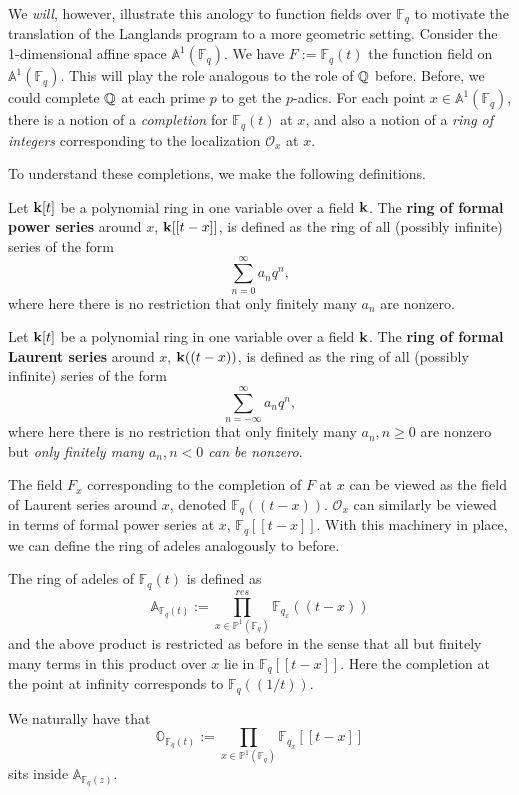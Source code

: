 We \emph{will}, however, illustrate this anology to function fields over $\mathbb F_q$ to motivate the translation of the Langlands program to a more geometric setting. Consider the 1-dimensional affine space $\mathbb A^1 (\mathbb F_q)$. We have $F := \mathbb F_q(t)$ the function field on $\mathbb A^1 (\mathbb F_q)$. This will play the role analogous to the role of $\mathbb{Q}$ before. Before, we could complete $\mathbb{Q}$ at each prime $p$ to get the $p$-adics. For each point $x \in \mathbb A^1 (\mathbb F_q)$, there is a notion of a \emph{completion} for $\mathbb F_q(t)$ at $x$, and also a notion of a \emph{ring of integers} corresponding to the localization $\mathcal O_x$ at $x$.

To understand these completions, we make the following definitions.
\begin{defn}
	Let $\mathbf{k}[t]$ be a polynomial ring in one variable over a field $\mathbf{k}$. The \textbf{ring of formal power series} around $x$, $\mathbf{k}[[t-x]]$, is defined as the ring of all (possibly infinite) series of the form
	\[
		\sum_{n=0}^\infty a_n q^n,
	\]
	where here there is no restriction that only finitely many $a_n$ are nonzero. 
\end{defn}

\begin{defn}
	Let $\mathbf{k}[t]$ be a polynomial ring in one variable over a field $\mathbf{k}$. The \textbf{ring of formal Laurent series} around $x$, $\mathbf{k}((t-x))$, is defined as the ring of all (possibly infinite) series of the form
	\[
		\sum_{n=-\infty}^\infty a_n q^n,
	\]
	where here there is no restriction that only finitely many $a_n, n \geq 0$ are nonzero but \emph{only finitely many $a_n, n<0$ can be nonzero}.
\end{defn}

The field $F_x$ corresponding to the completion of $F$ at $x$ can be viewed as the field of Laurent series around $x$, denoted $\mathbb F_q((t-x))$. $\mathcal O_x$ can similarly be viewed in terms of formal power series at $x$, $\mathbb F_q [[t-x]]$. With this machinery in place, we can define the ring of adeles analogously to before.

\begin{defn}
	The ring of adeles of $\mathbb F_q(t)$ is defined as 
	\[
		\mathbb A_{\mathbb F_q(t)} := \prod_{x \in \mathbb P^1(\mathbb F_q)}^{res} \mathbb F_{q_x}((t-x))
	\]
	and the above product is restricted as before in the sense that all but finitely many terms in this product over $x$ lie in $\mathbb F_q [[t-x]]$. Here the completion at the point at infinity corresponds to $\mathbb F_q ((1/t))$.
\end{defn}
We naturally have that 
\[
	\mathbb O_{\mathbb F_q(t)} := 	\prod_{x \in \mathbb P^1(\mathbb F_q)} \mathbb F_{q_x}[[t-x]]
\]
sits inside $\mathbb A_{\mathbb F_q(z)}$.

